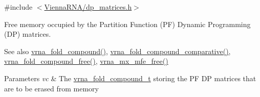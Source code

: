 {\ttfamily \#include $<$\hyperlink{dp__matrices_8h}{Vienna\+R\+N\+A/dp\+\_\+matrices.\+h}$>$}



Free memory occupied by the Partition Function (PF) Dynamic Programming (DP) matrices. 

\begin{DoxySeeAlso}{See also}
\hyperlink{group__fold__compound_ga6601d994ba32b11511b36f68b08403be}{vrna\+\_\+fold\+\_\+compound()}, \hyperlink{group__fold__compound_gad6bacc816af274922b13d947f708aa0c}{vrna\+\_\+fold\+\_\+compound\+\_\+comparative()}, \hyperlink{group__fold__compound_ga576a077b418a9c3650e06f8e5d296fc2}{vrna\+\_\+fold\+\_\+compound\+\_\+free()}, \hyperlink{group__dp__matrices_ga6a9422feb5dfe5c64050cebf447672d0}{vrna\+\_\+mx\+\_\+mfe\+\_\+free()}
\end{DoxySeeAlso}

\begin{DoxyParams}{Parameters}
{\em vc} & The \hyperlink{group__fold__compound_ga1b0cef17fd40466cef5968eaeeff6166}{vrna\+\_\+fold\+\_\+compound\+\_\+t} storing the PF DP matrices that are to be erased from memory \\
\hline
\end{DoxyParams}
